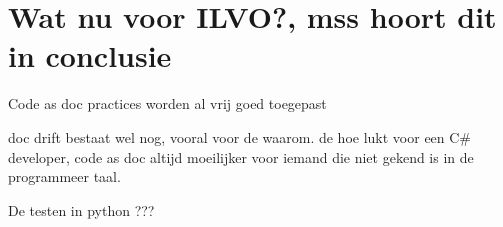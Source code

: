\section{Wat nu voor ILVO?, mss hoort dit in conclusie}
\label{sec:wnILVO}

Code as doc practices worden al vrij goed toegepast

doc drift bestaat wel nog, vooral voor de waarom. de hoe lukt voor een C\# developer, code as doc altijd moeilijker voor iemand die niet gekend is in de programmeer taal.

De testen in python ???
